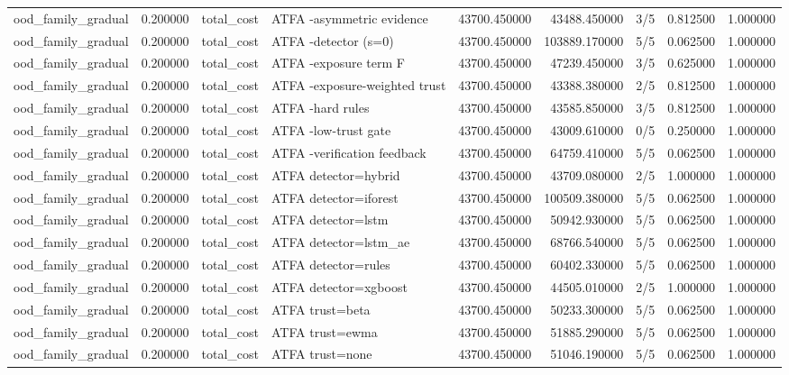 \begin{tabular}{lrllrrlrr}
ood\_family\_gradual & 0.200000 & total\_cost & ATFA -asymmetric evidence & 43700.450000 & 43488.450000 & 3/5 & 0.812500 & 1.000000 \\
ood\_family\_gradual & 0.200000 & total\_cost & ATFA -detector (s=0) & 43700.450000 & 103889.170000 & 5/5 & 0.062500 & 1.000000 \\
ood\_family\_gradual & 0.200000 & total\_cost & ATFA -exposure term F & 43700.450000 & 47239.450000 & 3/5 & 0.625000 & 1.000000 \\
ood\_family\_gradual & 0.200000 & total\_cost & ATFA -exposure-weighted trust & 43700.450000 & 43388.380000 & 2/5 & 0.812500 & 1.000000 \\
ood\_family\_gradual & 0.200000 & total\_cost & ATFA -hard rules & 43700.450000 & 43585.850000 & 3/5 & 0.812500 & 1.000000 \\
ood\_family\_gradual & 0.200000 & total\_cost & ATFA -low-trust gate & 43700.450000 & 43009.610000 & 0/5 & 0.250000 & 1.000000 \\
ood\_family\_gradual & 0.200000 & total\_cost & ATFA -verification feedback & 43700.450000 & 64759.410000 & 5/5 & 0.062500 & 1.000000 \\
ood\_family\_gradual & 0.200000 & total\_cost & ATFA detector=hybrid & 43700.450000 & 43709.080000 & 2/5 & 1.000000 & 1.000000 \\
ood\_family\_gradual & 0.200000 & total\_cost & ATFA detector=iforest & 43700.450000 & 100509.380000 & 5/5 & 0.062500 & 1.000000 \\
ood\_family\_gradual & 0.200000 & total\_cost & ATFA detector=lstm & 43700.450000 & 50942.930000 & 5/5 & 0.062500 & 1.000000 \\
ood\_family\_gradual & 0.200000 & total\_cost & ATFA detector=lstm\_ae & 43700.450000 & 68766.540000 & 5/5 & 0.062500 & 1.000000 \\
ood\_family\_gradual & 0.200000 & total\_cost & ATFA detector=rules & 43700.450000 & 60402.330000 & 5/5 & 0.062500 & 1.000000 \\
ood\_family\_gradual & 0.200000 & total\_cost & ATFA detector=xgboost & 43700.450000 & 44505.010000 & 2/5 & 1.000000 & 1.000000 \\
ood\_family\_gradual & 0.200000 & total\_cost & ATFA trust=beta & 43700.450000 & 50233.300000 & 5/5 & 0.062500 & 1.000000 \\
ood\_family\_gradual & 0.200000 & total\_cost & ATFA trust=ewma & 43700.450000 & 51885.290000 & 5/5 & 0.062500 & 1.000000 \\
ood\_family\_gradual & 0.200000 & total\_cost & ATFA trust=none & 43700.450000 & 51046.190000 & 5/5 & 0.062500 & 1.000000 \\

\end{tabular}
